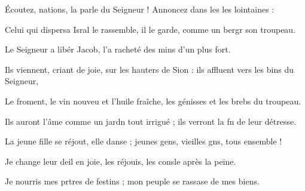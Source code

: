 \item Écoutez, nations, la parle du Seigneur !\psstar{} Annoncez dans les les lointaines :
\item Celui qui dispersa Isral le rassemble,\psstar{} il le garde, comme un bergr son troupeau.
\item Le Seigneur a libér Jacob,\psstar{} l’a racheté des mins d’un plus fort.
\item Ils viennent, criant de joie, sur les hauters de Sion :\psstar{} ils affluent vers les bins du Seigneur,
\item Le froment, le vin nouveu et l’huile fraîche,\psstar{} les génisses et les brebs du troupeau.
\item Ils auront l’âme comme un jardn tout irrigué ;\psstar{} ils verront la fn de leur détresse.
\item La jeune fille se réjout, elle danse ;\psstar{} jeunes gens, vieilles gns, tous ensemble !
\item Je change leur deil en joie,\psstar{} les réjouis, les consle après la peine.
\item Je nourris mes prtres de festins ;\psstar{} mon peuple se rassase de mes biens.